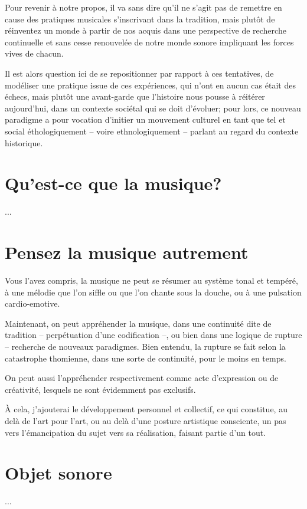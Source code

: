 \documentclass{article}
\newcommand{\footref}[1]{%
  \enotezwritemark{\enmarkstyle\ref{#1}}%
}
\begin{document}
%  
Pour revenir à notre propos, il va sans dire qu'il ne s'agit pas de remettre en cause des pratiques musicales s'inscrivant dans la tradition, mais plutôt de réinventez un monde à partir de nos acquis dans une perspective de recherche continuelle et sans cesse renouvelée de notre monde sonore impliquant les forces vives de chacun.

Il est alors question ici de se repositionner par rapport à ces tentatives, de modéliser une pratique issue de ces expériences, qui n'ont en aucun cas était des échecs, mais plutôt une avant-garde que l'histoire nous pousse à réitérer aujourd'hui, dans un contexte sociétal qui se doit d'évoluer; pour lors, ce nouveau paradigme a pour vocation d'initier un mouvement culturel en tant que tel et social éthologiquement -- voire ethnologiquement  -- parlant au regard du contexte historique.%


\bigskip

%    
  

\section{Qu’est-ce que la musique?}

...

\bigskip

%    
  

\section{Pensez la musique autrement}

Vous l'avez compris, la musique ne peut se résumer au système tonal et tempéré, à une mélodie que l'on siffle ou que l'on chante sous la douche, ou à une pulsation cardio-emotive.

Maintenant, on peut appréhender la musique, dans une continuité dite de tradition -- perpétuation d'une codification --, ou bien dans une logique de rupture -- recherche de nouveaux paradigmes. Bien entendu, la rupture se fait selon la catastrophe thomienne, dans une sorte de continuité, pour le moins en temps. 

On peut aussi l'appréhender respectivement comme acte d'expression ou de créativité, lesquels ne sont évidemment pas exclusifs.

À cela, j'ajouterai le développement personnel et collectif, ce qui constitue, au delà de l'art pour l'art, ou au delà d'une posture artistique consciente, un pas vers l'émancipation du sujet vers sa réalisation, faisant partie d'un tout.




\bigskip

%    
  

\section{Objet sonore}

...

\newpage
  
\nolinenumbers
{}
\printendnotes

\newpage
\end{document}
